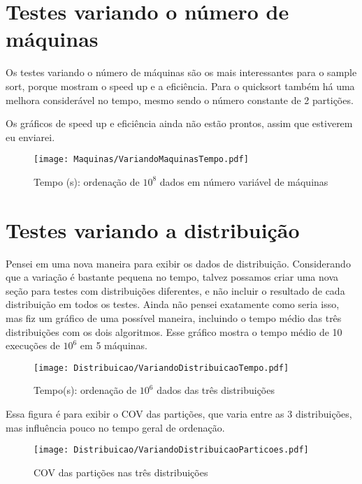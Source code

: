 \documentclass[12pt,a4paper]{article}
\begin{document}
\newpage

\section{Testes variando o número de máquinas}

Os testes variando o número de máquinas são os mais interessantes para o sample sort, porque mostram o speed up e a eficiência.
Para o quicksort também há uma melhora considerável no tempo, mesmo sendo o número constante de 2 partições. 

Os gráficos de speed up e eficiência ainda não estão prontos, assim que estiverem eu enviarei. 

\begin{figure}[!htb]
\texttt{[image: Maquinas/VariandoMaquinasTempo.pdf]} 
\caption{Tempo (s): ordenação de $10^8$ dados em número variável de máquinas}
\end{figure}


\newpage


\section{Testes variando a distribuição}

Pensei em uma nova maneira para exibir os dados de distribuição.
Considerando que a variação é bastante pequena no tempo, talvez possamos criar uma nova seção para testes com distribuições diferentes, 
e não incluir o resultado de cada distribuição em todos os testes. 
Ainda não pensei exatamente como seria isso, mas fiz um gráfico de uma possível maneira, incluindo o tempo médio das três distribuições com os dois algoritmos.
Esse gráfico mostra o tempo médio de 10 execuções de $10^6$ em 5 máquinas. 

\begin{figure}[!htb]
\texttt{[image: Distribuicao/VariandoDistribuicaoTempo.pdf]} 
\caption{Tempo(s): ordenação de $10^6$ dados das três distribuições }
\end{figure}

Essa figura é para exibir o COV das partições, que varia entre as 3 distribuições, mas influência pouco no tempo geral de ordenação.
\begin{figure}[!htb]
\texttt{[image: Distribuicao/VariandoDistribuicaoParticoes.pdf]} 
\caption{COV das partições nas três distribuições }
\end{figure}
\end{document}
